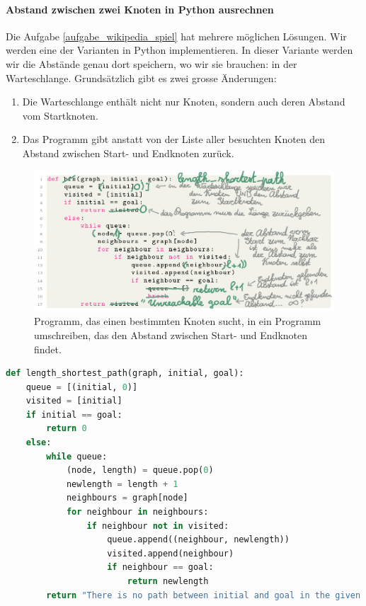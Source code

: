 \paragraph{Abstand zwischen zwei Knoten in Python ausrechnen}
Die Aufgabe \ref{aufgabe_wikipedia_spiel} hat mehrere möglichen Lösungen. Wir werden eine der Varianten in Python implementieren. In dieser Variante werden wir die Abstände genau dort speichern, wo wir sie brauchen: in der Warteschlange. Grundsätzlich gibt es zwei grosse Änderungen:
\begin{enumerate}
    \item Die Warteschlange enthält nicht nur Knoten, sondern auch deren Abstand vom Startknoten.
    \item Das Programm gibt anstatt von der Liste aller besuchten Knoten den Abstand zwischen Start- und Endknoten zurück.
\end{enumerate}

\begin{figure}[H]
    \centering
    \includegraphics[width=\textwidth]{Pictures/SP/bfs_goal-to-length.png}
    \caption{Programm, das einen bestimmten Knoten sucht, in ein Programm umschreiben, das den Abstand zwischen Start- und Endknoten findet.}
    \label{fig:bfs_goal_to_length}
\end{figure}

\begin{lstlisting}[language=Python, caption={Programm, das den Abstand zwischen \texttt{initial} und \texttt{goal} berechnet.}, label={lst:length_shortest_path}]
def length_shortest_path(graph, initial, goal):
    queue = [(initial, 0)]
    visited = [initial]
    if initial == goal:
        return 0
    else:
        while queue:
            (node, length) = queue.pop(0)
            newlength = length + 1
            neighbours = graph[node]
            for neighbour in neighbours:
                if neighbour not in visited:
                    queue.append((neighbour, newlength))
                    visited.append(neighbour)
                    if neighbour == goal:
                        return newlength
        return "There is no path between initial and goal in the given graph"
\end{lstlisting}

